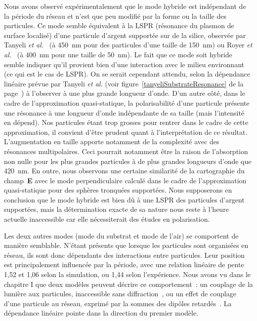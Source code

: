 Nous avons observé expérimentalement que le mode hybride est indépendant de la période du réseau et n'est que peu modifié par la forme ou la taille des particules. Ce mode semble équivalent à la LSPR (résonance du plasmon de surface localisé) d'une particule d'argent supportée sur de la silice, observée par Tanyeli \textit{et al.}~\cite{tanyeli2013effect} (à 450~nm pour des particules d'une taille de 150~nm) ou Royer \textit{et al.}~\cite{royer1987substrate} (à 400~nm pour une taille de 50~nm). Le fait que ce mode soit hybride semble indiquer qu'il provient bien d'une interaction avec le milieu environnant (ce qui est le cas de LSPR). On se serait cependant attendu, selon la dépendance linéaire prévue par Tanyeli \textit{et al.} (voir figure~\ref{tanyeliSubstrateResonance} de la page~\pageref{tanyeliSubstrateResonance}) à l'observer à une plus grande longueur d'onde. D'un autre côté, dans le cadre de l'approximation quasi-statique, la polarisabilité d'une particule présente une résonance à une longueur d'onde indépendante de sa taille (mais l'intensité en dépend). Nos particules étant trop grosses pour rentrer dans le cadre de cette approximation, il convient d'être prudent quant à l'interprétation de ce résultat. L'augmentation en taille apporte notamment de la complexité avec des résonances multipolaires. Ceci pourrait notamment être la raison de l'absorption non nulle pour les plus grandes particules à de plus grandes longueurs d'onde que 420~nm. En outre, nous observons une certaine similarité de la cartographie du champ~\textbf{E} avec le mode perpendiculaire calculé dans le cadre de l'approximation quasi-statique pour des sphères tronquées supportées.  Nous supposerons en conclusion que le mode hybride est bien dû à une LSPR des particules d'argent supportées, mais la détermination exacte de sa nature nous reste à l'heure actuelle inaccessible car elle nécessiterait des études en polarisation.\par 
Les deux autres modes (mode du substrat et mode de l'air) se comportent de manière semblable. N'étant présents que lorsque les particules sont organisées en réseau, ils sont donc dépendants des interactions entre particules. Leur position est principalement influencée par la période, avec une relation linéaire de pente 1,52 et 1,06 selon la simulation, ou 1,44 selon l'expérience. 
Nous avons vu dans le chapitre I que deux modèles peuvent décrire ce comportement~: un couplage de la lumière aux particules, inaccessible sans diffraction~\cite{kravets2008extremely}, ou un effet de couplage d'une particule au réseau, exprimé par la sommes des dipôles retardés~\cite{zou2004narrow}. La dépendance linéaire pointe dans la direction du premier modèle.\par 
